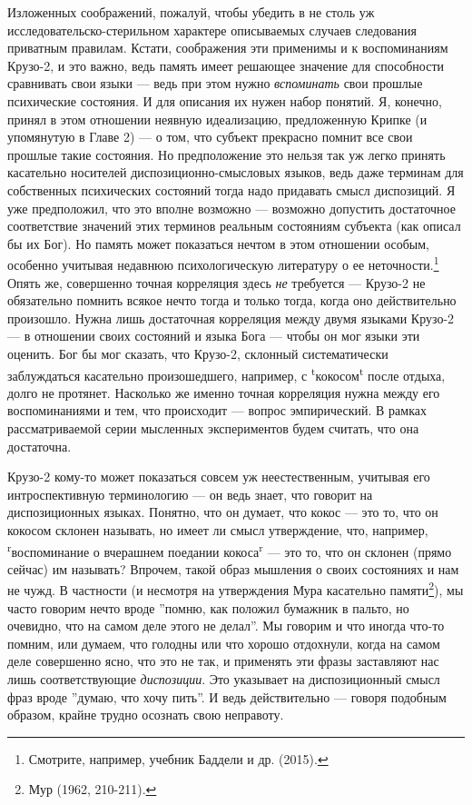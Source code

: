 \documentclass[11pt]{book}
\begin{document}
Изложенных соображений, пожалуй, чтобы убедить в не столь уж исследовательско-стерильном характере описываемых случаев следования приватным правилам. Кстати, соображения эти применимы и к воспоминаниям Крузо-2, и это важно, ведь память имеет решающее значение для способности сравнивать свои языки --- ведь при этом нужно \textit{вспоминать} свои прошлые психические состояния. И для описания их нужен набор понятий. Я, конечно, принял в этом отношении неявную идеализацию, предложенную Крипке (и упомянутую в Главе 2) --- о том, что субъект прекрасно помнит все свои прошлые такие состояния. Но предположение это нельзя так уж легко принять касательно носителей диспозиционно-смысловых языков, ведь даже терминам для собственных психических состояний тогда надо придавать смысл диспозиций. Я уже предположил, что это вполне возможно --- возможно допустить достаточное соответствие значений этих терминов реальным состояниям субъекта (как описал бы их Бог). Но память может показаться нечтом в этом отношении особым, особенно учитывая недавнюю психологическую литературу о ее неточности.\footnote{Смотрите, например, учебник Баддели и др. (2015).} Опять же, совершенно точная корреляция здесь \textit{не} требуется --- Крузо-2 не обязательно помнить всякое нечто тогда и только тогда, когда оно действительно произошло. Нужна лишь достаточная корреляция между двумя языками Крузо-2 --- в отношении своих состояний и языка Бога --- чтобы он мог языки эти оценить. Бог бы мог сказать, что Крузо-2, склонный систематически заблуждаться касательно произошедшего, например, с \textsuperscript{t}кокосом\textsuperscript{t} после отдыха, долго не протянет. Насколько же именно точная корреляция нужна между его воспоминаниями и тем, что происходит --- вопрос эмпирический. В рамках рассматриваемой серии мысленных экспериментов будем считать, что она достаточна.

Крузо-2 кому-то может показаться совсем уж неестественным, учитывая его интроспективную терминологию --- он ведь знает, что говорит на диспозиционных языках. Понятно, что он думает, что кокос --- это то, что он кокосом склонен называть, но имеет ли смысл утверждение, что, например, \textsuperscript{r}воспоминание о вчерашнем поедании кокоса\textsuperscript{r} --- это то, что он склонен (прямо сейчас) им называть? Впрочем, такой образ мышления о своих состояниях и нам не чужд. В частности (и несмотря на утверждения Мура касательно памяти\footnote{Мур (1962, 210-211).}), мы часто говорим нечто вроде ''помню, как положил бумажник в пальто, но очевидно, что на самом деле этого не делал''. Мы говорим и что иногда что-то помним, или думаем, что голодны или что хорошо отдохнули, когда на самом деле совершенно ясно, что это не так, и применять эти фразы заставляют нас лишь соответствующие \textit{диспозиции}. Это указывает на диспозиционный смысл фраз вроде ''думаю, что хочу пить''. И ведь действительно --- говоря подобным образом, крайне трудно осознать свою неправоту.
\end{document}
